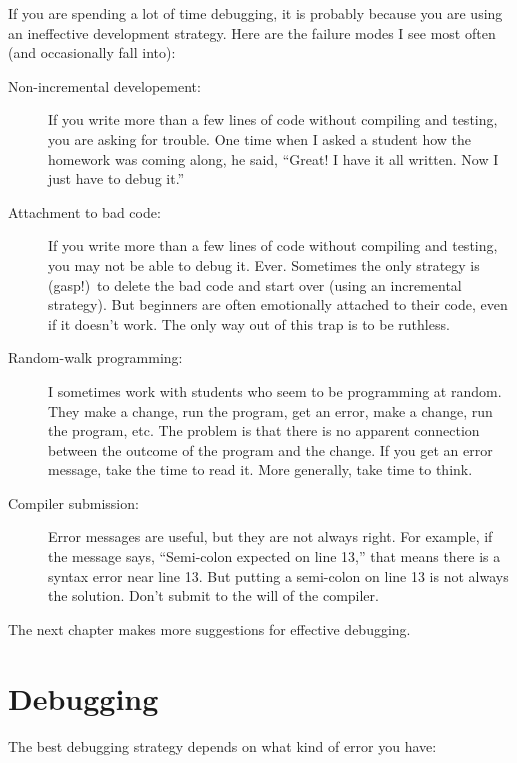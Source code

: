 \documentclass[12pt]{book}
\theoremstyle{exercise}
\begin{document}
If you are spending a lot of time debugging, it is probably
because you are using an ineffective development strategy.  Here
are the failure modes I see most often (and occasionally fall into):

\begin{description}

\item[Non-incremental developement:] If you write more than a few
  lines of code without compiling and testing, you are asking for
  trouble.  One time when I asked a student how the homework was
  coming along, he said, ``Great!  I have it all written.  Now I just
  have to debug it.''

\item[Attachment to bad code:] If you write more than a few lines of
  code without compiling and testing, you may not be able to debug it.
  Ever.  Sometimes the only strategy is (gasp!)~to delete the bad
  code and start over (using an incremental strategy).  But beginners
  are often emotionally attached to their code, even if it doesn't
  work.  The only way out of this trap is to be ruthless.

\item[Random-walk programming:] I sometimes work with students who
  seem to be programming at random.  They make a change, run the
  program, get an error, make a change, run the program, etc.  The
  problem is that there is no apparent connection between the outcome
  of the program and the change.
%
  If you get an error message, take the time to read it.
  More generally, take time to think.

\item[Compiler submission:] Error messages are useful, but they
  are not always right.  For example, if the message says, ``Semi-colon
  expected on line 13,'' that means there is a syntax error near
  line 13. But putting a semi-colon on line 13 is not always the
  solution.  Don't submit to the will of the compiler.

\end{description}

The next chapter makes more suggestions for effective debugging.


\chapter{Debugging}
\label{debug}

The best debugging strategy depends on what kind of error
you have:
\end{document}
